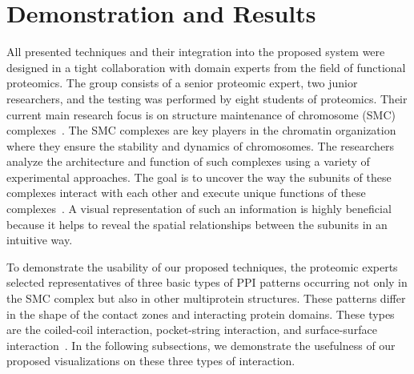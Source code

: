 \documentclass{bmcart}
\def\MatView {Matrix view\xspace}
\begin{document}

\section{Demonstration and Results}
All presented techniques and their integration into the proposed system were designed in a tight collaboration with domain experts from the field of functional proteomics.
The group consists of a senior proteomic expert, two junior researchers, and the testing was performed by eight students of proteomics.
Their current main research focus is on structure maintenance of chromosome (SMC) complexes~\cite{Palecek2015}. 
The SMC complexes are key players in the chromatin organization where they ensure the stability and dynamics of chromosomes. 
The researchers analyze the architecture and function of such complexes using a variety of experimental approaches. 
The goal is to uncover the way the subunits of these complexes interact with each other and execute unique functions of these complexes~\cite{Gligoris}. 
A visual representation of such an information is highly beneficial because it helps to reveal the spatial relationships between the subunits in an intuitive way.

To demonstrate the usability of our proposed techniques, the proteomic experts selected representatives of three basic types of PPI patterns occurring not only in the SMC complex but also in other multiprotein structures. 
These patterns differ in the shape of the contact zones and interacting protein domains.
These types are the coiled-coil interaction, pocket-string interaction, and surface-surface interaction~\cite{alberts02molecular}.
In the following subsections, we demonstrate the usefulness of our proposed visualizations on these three types of interaction.
\end{document}

